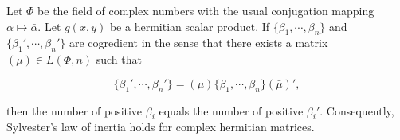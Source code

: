 Let $\Phi$ be the field of complex numbers with the usual conjugation mapping $\alpha \mapsto \bar{\alpha}$. Let $g(x, y)$ be a hermitian scalar product. If $\{\beta_1, \cdots, \beta_n\}$ and $\{\beta_1', \cdots, \beta_n'\}$ are cogredient in the sense that there exists a matrix $(\mu) \in L(\Phi, n)$ such that

$$\{\beta_1', \cdots, \beta_n'\} = (\mu)\{\beta_1, \cdots, \beta_n\}(\bar{\mu})',$$

then the number of positive $\beta_i$ equals the number of positive $\beta_i'$. Consequently, Sylvester's law of inertia holds for complex hermitian matrices.
